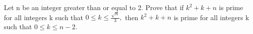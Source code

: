 \item Let n be an integer greater than or equal to 2. Prove that if $k^2 + k + n$ is prime for all integers k such that $0 \leq k \leq \frac{\sqrt{n}}{3},$ then $k^2 + k + n$ is prime for all integers k such that $0 \leq k \leq n - 2.$


















